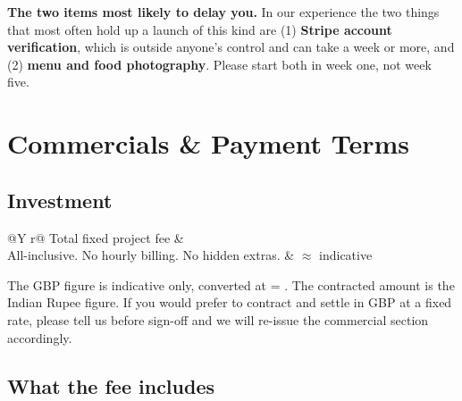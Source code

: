 \documentclass[11pt,a4paper]{article}
\begin{document}
\begin{warnbox}
\textbf{The two items most likely to delay you.} In our experience the two things that
most often hold up a launch of this kind are (1) \textbf{Stripe account verification},
which is outside anyone's control and can take a week or more, and (2) \textbf{menu and
food photography}. Please start both in week one, not week five.
\end{warnbox}

\clearpage
\section{Commercials \& Payment Terms}

\subsection{Investment}

\begin{tcolorbox}[enhanced,colback=brandnavy,colframe=brandnavy,boxrule=0pt,arc=0pt,
  outer arc=0pt,left=18pt,right=18pt,top=14pt,bottom=14pt]
\begin{tabularx}{\linewidth}{@{}Y r@{}}
{\color{white}\sffamily\large Total fixed project fee} &
{\color{white}\sffamily\bfseries\fontsize{27}{30}\selectfont {}} \\[2pt]
{\color{white!70}\sffamily\small All-inclusive. No hourly billing. No hidden extras.} &
{\color{brandaccent}\sffamily\small $\approx$ indicative} \\
\end{tabularx}
\end{tcolorbox}

\vspace{4pt}
{\color{brandgrey}\footnotesize The GBP figure is indicative only, converted at
 = . The contracted amount is the Indian Rupee figure. If you would
prefer to contract and settle in GBP at a fixed rate, please tell us before sign-off and
we will re-issue the commercial section accordingly.}

\subsection{What the fee includes}
\end{document}
